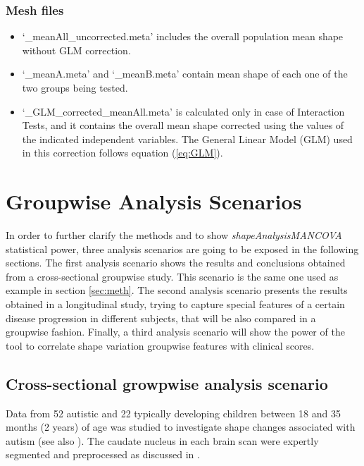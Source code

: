 \documentclass{InsightArticle}
\newcommand{\ProgramName}{\textit{shapeAnalysisMANCOVA}}
\begin{document}
\subsubsection{Mesh files}
\label{sec:mfiles} 

\begin{itemize}
	\item `\_meanAll\_uncorrected.meta' includes the overall population mean shape without GLM correction.
	\item `\_meanA.meta' and `\_meanB.meta' contain mean shape of each one of the two groups being tested.
	\item `\_GLM\_corrected\_meanAll.meta' is calculated only in case of Interaction Tests, and it contains the overall mean shape corrected using the values of the indicated independent variables. The General Linear Model (GLM) used in this correction follows equation (\ref{eq:GLM}).  
\end{itemize}

\section{Groupwise Analysis Scenarios}
\label{sec:results}
In order to further clarify the methods and to show  \ProgramName \textit{ } statistical power, three analysis scenarios are going to be exposed in the following sections. The first analysis scenario shows the results and conclusions obtained from a cross-sectional groupwise study. This scenario is the same one used as example in section \ref{sec:meth}. The second analysis scenario presents the results obtained in a longitudinal study, trying to capture special features of a certain disease progression in different subjects, that will be also compared in a groupwise fashion. Finally, a third analysis scenario will show the power of the tool to correlate shape variation groupwise features with clinical scores.

\subsection{Cross-sectional growpwise analysis scenario}
\label{sec:crosssec}

Data from 52 autistic and 22 typically developing children between 18 and 35 months (2 years) of age was studied to investigate shape changes associated with autism (see also \cite{Hazlett05}). The caudate nucleus in each brain scan were expertly segmented and preprocessed as discussed in \cite{Styner06}. 
\end{document}
